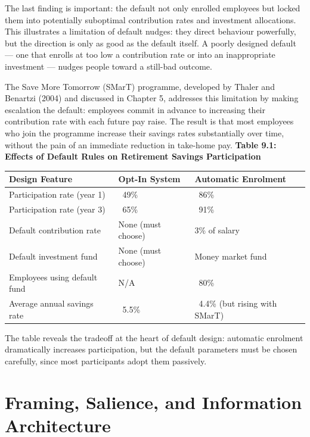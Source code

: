 \documentclass[12pt, letterpaper]{article}
\begin{document}
The last finding is important: the default not only enrolled employees but locked them into potentially suboptimal contribution rates and investment allocations. This illustrates a limitation of default nudges: they direct behaviour powerfully, but the direction is only as good as the default itself. A poorly designed default --- one that enrolls at too low a contribution rate or into an inappropriate investment --- nudges people toward a still-bad outcome.

The Save More Tomorrow (SMarT) programme, developed by Thaler and Benartzi (2004) and discussed in Chapter 5, addresses this limitation by making escalation the default: employees commit in advance to increasing their contribution rate with each future pay raise. The result is that most employees who join the programme increase their savings rates substantially over time, without the pain of an immediate reduction in take-home pay.
\newpage
\textbf{Table 9.1: Effects of Default Rules on Retirement Savings Participation}


\begin{table}[H]
\centering
\small
\begin{tabularx}{\linewidth}{lYY}
\toprule
Design Feature & Opt-In System & Automatic Enrolment \\
\midrule
Participation rate (year 1) & ~49\% & ~86\% \\
Participation rate (year 3) & ~65\% & ~91\% \\
Default contribution rate & None (must choose) & 3\% of salary \\
Default investment fund & None (must choose) & Money market fund \\
Employees using default fund & N/A & ~80\% \\
Average annual savings rate & ~5.5\% & ~4.4\% (but rising with SMarT) \\
\bottomrule
\end{tabularx}
\end{table}


The table reveals the tradeoff at the heart of default design: automatic enrolment dramatically increases participation, but the default parameters must be chosen carefully, since most participants adopt them passively.

\medskip


\section{Framing, Salience, and Information Architecture}
\end{document}
